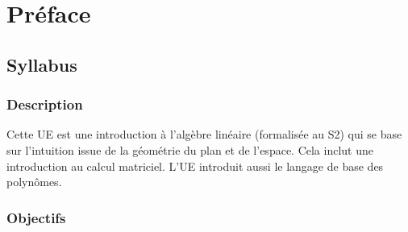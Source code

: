 
\chapter*{Préface}


\section*{Syllabus}

\subsection*{Description}

Cette UE est une introduction à l'algèbre linéaire (formalisée au S2) qui se base sur l'intuition issue de la géométrie du plan et de l'espace.
Cela inclut une introduction au calcul matriciel.
L'UE introduit aussi le langage de base des polynômes.

\subsection*{Objectifs}


